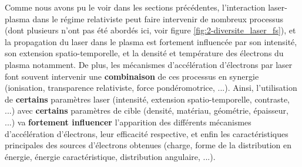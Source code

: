 \begin{refsection}
Comme nous avons pu le voir dans les sections précédentes, l'interaction laser-plasma dans le régime relativiste peut faire intervenir de nombreux processus (dont plusieurs n'ont pas été abordés ici, voir figure \ref{fig:2-diversite_laser_fs}), et la propagation du laser dans le plasma est fortement influencée par son intensité, son extension spatio-temporelle, et la densité et température des électrons du plasma notamment. De plus, les mécanismes d'accélération d'électrons par laser font souvent intervenir une \textbf{combinaison} de ces processus en synergie (ionisation, transparence relativiste, force pondéromotrice, ...). Ainsi, l'utilisation de \textbf{certains} paramètres laser (intensité, extension spatio-temporelle, contraste, ...) avec \textbf{certains} paramètres de cible (densité, matériau, géométrie, épaisseur, ...) va \textbf{fortement influencer} l'apparition des différents mécanismes d'accélération d'électrons, leur efficacité respective, et enfin les caractéristiques principales des sources d'électrons obtenues (charge, forme de la distribution en énergie, énergie caractéristique, distribution angulaire, ...). 

\end{refsection}
